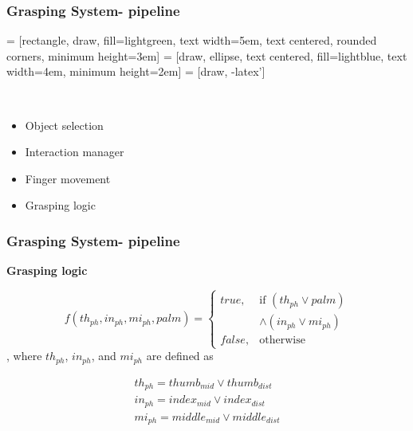\documentclass{beamer}
\theoremstyle{remark}
\theoremstyle{plain}
\begin{document}
\begin{frame}
\frametitle{Grasping System- pipeline}


 = [rectangle, draw, fill=lightgreen, 
text width=5em, text centered, rounded corners, minimum height=3em]
 = [draw, ellipse, text centered, fill=lightblue, text width=4em,
minimum height=2em]
 = [draw, -latex']

\begin{figure}[!t]
	\centering
	$  $
	\label{fig:pipeline}
\end{figure}

\begin{itemize}
	\item Object selection
	\item Interaction manager
	\item Finger movement
	\item Grasping logic
\end{itemize}

\end{frame}


\begin{frame}
\frametitle{Grasping System- pipeline}

\textbf{Grasping logic}

\begin{equation} \label{eq:3}
f(th_{ph}, in_{ph}, mi_{ph}, palm)= 
\begin{cases}
true, & \text{if } (th_{ph} \lor palm) \\
& \land (in_{ph} \lor mi_{ph})\\
false,              & \text{otherwise}
\end{cases}
\end{equation}, where $th_{ph}$, $in_{ph}$, and $mi_{ph}$ are defined as

\begin{equation} \label{eq:4}
\begin{array}{l}
th_{ph} = thumb_{mid} \lor thumb_{dist} \\
in_{ph} = index_{mid} \lor index_{dist} \\
mi_{ph} = middle_{mid} \lor middle_{dist} \\
\end{array}
\end{equation}

\end{frame}
\end{document}
